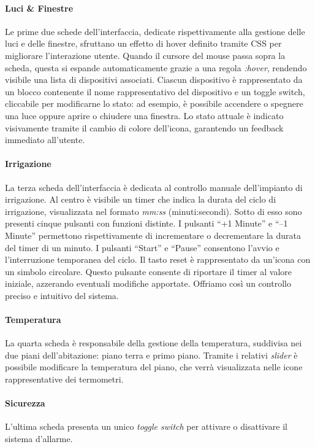 \documentclass[italian, 12pt, a4paper]{article}
\begin{document}
\paragraph{Luci \& Finestre}Le prime due schede dell’interfaccia, dedicate rispettivamente alla gestione delle luci e delle finestre, sfruttano un effetto di hover definito tramite CSS per migliorare l’interazione utente. Quando il cursore del mouse passa sopra la scheda, questa si espande automaticamente grazie a una regola \emph{:hover}, rendendo visibile una lista di dispositivi associati. Ciascun dispositivo è rappresentato da un blocco contenente il nome rappresentativo del dispositivo e un toggle switch, cliccabile per modificarne lo stato: ad esempio, è possibile accendere o spegnere una luce oppure aprire o chiudere una finestra. Lo stato attuale è indicato visivamente tramite il cambio di colore dell’icona, garantendo un feedback immediato all’utente.\\
\paragraph{Irrigazione}La terza scheda dell’interfaccia è dedicata al controllo manuale dell’impianto di irrigazione. Al centro è visibile un timer che indica la durata del ciclo di irrigazione, visualizzata nel formato \emph{mm:ss} (minuti:secondi). Sotto di esso sono presenti cinque pulsanti con funzioni distinte. I pulsanti “+1 Minute” e “–1 Minute” permettono rispettivamente di incrementare o decrementare la durata del timer di un minuto.  I pulsanti “Start” e “Pause” consentono l’avvio e l’interruzione temporanea del ciclo. Il tasto reset è rappresentato da un’icona con un simbolo circolare. Questo pulsante consente di riportare il timer al valore iniziale, azzerando eventuali modifiche apportate. Offriamo così un controllo preciso e intuitivo del sistema.\\
\paragraph{Temperatura}La quarta scheda è responsabile della gestione della temperatura, suddivisa nei due piani dell'abitazione: piano terra e primo piano. Tramite i relativi \emph{slider} è possibile modificare la temperatura del piano, che verrà visualizzata nelle icone rappresentative dei termometri.
\paragraph{Sicurezza}L'ultima scheda presenta un unico \emph{toggle switch} per attivare o disattivare il sistema d'allarme.
\end{document}
